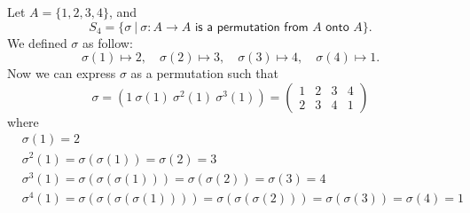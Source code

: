 \begin{example}
    Let $A = \{1,2,3,4\}$, and 
    \[
        S_4 = \{ \sigma \> | \> \sigma : A \to A \textsf{ is a permutation from } A \textsf{ onto } A \}.
    \]
    We defined $\sigma$ as follow:
    \[
        \sigma(1) \mapsto 2, \quad \sigma(2) \mapsto 3, \quad \sigma(3) \mapsto 4, \quad \sigma(4)\mapsto 1.
    \]
    Now we can express $\sigma$ as a permutation such that 
    \[
        \sigma = (1 \> \sigma(1) \> \sigma^2(1) \> \sigma^3(1)) = \begin{pmatrix}
            1 & 2 & 3 & 4\\
            2 & 3 & 4 & 1
        \end{pmatrix}
    \]
    where 
    \begin{align*}
        &\sigma(1) = 2\\
        &\sigma^2(1) = \sigma(\sigma(1)) = \sigma(2) = 3\\
        &\sigma^3(1) = \sigma(\sigma(\sigma(1))) = \sigma(\sigma(2)) = \sigma(3) = 4\\
        &\sigma^4(1) = \sigma(\sigma(\sigma(\sigma(1)))) = \sigma(\sigma(\sigma(2))) = \sigma(\sigma(3)) = \sigma(4) = 1\\
    \end{align*}
\end{example}

